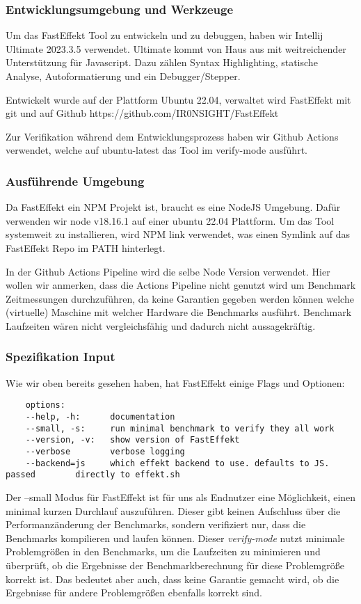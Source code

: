 \subsubsection{Entwicklungsumgebung und Werkzeuge}
Um das FastEffekt Tool zu entwickeln und zu debuggen, haben wir Intellij Ultimate 2023.3.5 verwendet. Ultimate kommt von Haus aus mit weitreichender Unterstützung für Javascript.
Dazu zählen Syntax Highlighting, statische Analyse, Autoformatierung und ein Debugger/Stepper.

Entwickelt wurde auf der Plattform Ubuntu 22.04, verwaltet wird FastEffekt mit git und auf Github https://github.com/IR0NSIGHT/FastEffekt

Zur Verifikation während dem Entwicklungsprozess haben wir Github Actions verwendet, welche auf ubuntu-latest das Tool im verify-mode ausführt.

\subsubsection{Ausführende Umgebung}
Da FastEffekt ein NPM Projekt ist, braucht es eine NodeJS Umgebung.
Dafür verwenden wir node v18.16.1 auf einer ubuntu 22.04 Plattform.
Um das Tool systemweit zu installieren, wird NPM link verwendet, was einen Symlink auf das FastEffekt Repo im PATH hinterlegt.

In der Github Actions Pipeline wird die selbe Node Version verwendet.
Hier wollen wir anmerken, dass die Actions Pipeline nicht genutzt wird um Benchmark Zeitmessungen durchzuführen, da keine Garantien gegeben werden können welche (virtuelle) Maschine mit welcher Hardware die Benchmarks ausführt. Benchmark Laufzeiten wären nicht vergleichsfähig und dadurch nicht aussagekräftig.

\subsubsection{Spezifikation Input}
Wie wir oben bereits gesehen haben, hat FastEffekt einige Flags und Optionen:
\begin{lstlisting}
    options:
    --help, -h:      documentation
    --small, -s:     run minimal benchmark to verify they all work
    --version, -v:   show version of FastEffekt
    --verbose        verbose logging
    --backend=js     which effekt backend to use. defaults to JS. passed        directly to effekt.sh
\end{lstlisting}

Der --small Modus für FastEffekt ist für uns als Endnutzer eine Möglichkeit, einen minimal kurzen Durchlauf auszuführen. Dieser gibt keinen Aufschluss über die Performanzänderung der Benchmarks, sondern verifiziert nur, dass die Benchmarks kompilieren und laufen können. Dieser \textit{verify-mode} nutzt minimale Problemgrößen in den Benchmarks, um die Laufzeiten zu minimieren und überprüft, ob die Ergebnisse der Benchmarkberechnung für diese Problemgröße korrekt ist. Das bedeutet aber auch, dass keine Garantie gemacht wird, ob die Ergebnisse für andere Problemgrößen ebenfalls korrekt sind.

